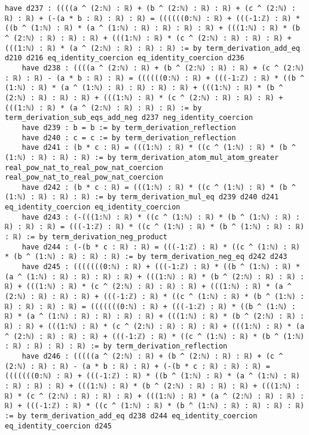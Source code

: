 \documentclass{article}
\begin{document}
\begin{tcolorbox}[colback=white!10, width=\linewidth]
\begin{lstlisting}[language=Lean4]
    have d237 : ((((a ^ (2:ℕ) : ℝ) + (b ^ (2:ℕ) : ℝ) : ℝ) + (c ^ (2:ℕ) : ℝ) : ℝ) + (-(a * b : ℝ) : ℝ) : ℝ) = ((((((0:ℕ) : ℝ) + (((-1:ℤ) : ℝ) * ((b ^ (1:ℕ) : ℝ) * (a ^ (1:ℕ) : ℝ) : ℝ) : ℝ) : ℝ) + (((1:ℕ) : ℝ) * (b ^ (2:ℕ) : ℝ) : ℝ) : ℝ) + (((1:ℕ) : ℝ) * (c ^ (2:ℕ) : ℝ) : ℝ) : ℝ) + (((1:ℕ) : ℝ) * (a ^ (2:ℕ) : ℝ) : ℝ) : ℝ) := by term_derivation_add_eq d210 d216 eq_identity_coercion eq_identity_coercion d236
    have d238 : ((((a ^ (2:ℕ) : ℝ) + (b ^ (2:ℕ) : ℝ) : ℝ) + (c ^ (2:ℕ) : ℝ) : ℝ) - (a * b : ℝ) : ℝ) = ((((((0:ℕ) : ℝ) + (((-1:ℤ) : ℝ) * ((b ^ (1:ℕ) : ℝ) * (a ^ (1:ℕ) : ℝ) : ℝ) : ℝ) : ℝ) + (((1:ℕ) : ℝ) * (b ^ (2:ℕ) : ℝ) : ℝ) : ℝ) + (((1:ℕ) : ℝ) * (c ^ (2:ℕ) : ℝ) : ℝ) : ℝ) + (((1:ℕ) : ℝ) * (a ^ (2:ℕ) : ℝ) : ℝ) : ℝ) := by term_derivation_sub_eqs_add_neg d237 neg_identity_coercion
    have d239 : b = b := by term_derivation_reflection
    have d240 : c = c := by term_derivation_reflection
    have d241 : (b * c : ℝ) = (((1:ℕ) : ℝ) * ((c ^ (1:ℕ) : ℝ) * (b ^ (1:ℕ) : ℝ) : ℝ) : ℝ) := by term_derivation_atom_mul_atom_greater real_pow_nat_to_real_pow_nat_coercion real_pow_nat_to_real_pow_nat_coercion
    have d242 : (b * c : ℝ) = (((1:ℕ) : ℝ) * ((c ^ (1:ℕ) : ℝ) * (b ^ (1:ℕ) : ℝ) : ℝ) : ℝ) := by term_derivation_mul_eq d239 d240 d241 eq_identity_coercion eq_identity_coercion
    have d243 : (-(((1:ℕ) : ℝ) * ((c ^ (1:ℕ) : ℝ) * (b ^ (1:ℕ) : ℝ) : ℝ) : ℝ) : ℝ) = (((-1:ℤ) : ℝ) * ((c ^ (1:ℕ) : ℝ) * (b ^ (1:ℕ) : ℝ) : ℝ) : ℝ) := by term_derivation_neg_product
    have d244 : (-(b * c : ℝ) : ℝ) = (((-1:ℤ) : ℝ) * ((c ^ (1:ℕ) : ℝ) * (b ^ (1:ℕ) : ℝ) : ℝ) : ℝ) := by term_derivation_neg_eq d242 d243
    have d245 : (((((((0:ℕ) : ℝ) + (((-1:ℤ) : ℝ) * ((b ^ (1:ℕ) : ℝ) * (a ^ (1:ℕ) : ℝ) : ℝ) : ℝ) : ℝ) + (((1:ℕ) : ℝ) * (b ^ (2:ℕ) : ℝ) : ℝ) : ℝ) + (((1:ℕ) : ℝ) * (c ^ (2:ℕ) : ℝ) : ℝ) : ℝ) + (((1:ℕ) : ℝ) * (a ^ (2:ℕ) : ℝ) : ℝ) : ℝ) + (((-1:ℤ) : ℝ) * ((c ^ (1:ℕ) : ℝ) * (b ^ (1:ℕ) : ℝ) : ℝ) : ℝ) : ℝ) = (((((((0:ℕ) : ℝ) + (((-1:ℤ) : ℝ) * ((b ^ (1:ℕ) : ℝ) * (a ^ (1:ℕ) : ℝ) : ℝ) : ℝ) : ℝ) + (((1:ℕ) : ℝ) * (b ^ (2:ℕ) : ℝ) : ℝ) : ℝ) + (((1:ℕ) : ℝ) * (c ^ (2:ℕ) : ℝ) : ℝ) : ℝ) + (((1:ℕ) : ℝ) * (a ^ (2:ℕ) : ℝ) : ℝ) : ℝ) + (((-1:ℤ) : ℝ) * ((c ^ (1:ℕ) : ℝ) * (b ^ (1:ℕ) : ℝ) : ℝ) : ℝ) : ℝ) := by term_derivation_reflection
    have d246 : (((((a ^ (2:ℕ) : ℝ) + (b ^ (2:ℕ) : ℝ) : ℝ) + (c ^ (2:ℕ) : ℝ) : ℝ) - (a * b : ℝ) : ℝ) + (-(b * c : ℝ) : ℝ) : ℝ) = (((((((0:ℕ) : ℝ) + (((-1:ℤ) : ℝ) * ((b ^ (1:ℕ) : ℝ) * (a ^ (1:ℕ) : ℝ) : ℝ) : ℝ) : ℝ) + (((1:ℕ) : ℝ) * (b ^ (2:ℕ) : ℝ) : ℝ) : ℝ) + (((1:ℕ) : ℝ) * (c ^ (2:ℕ) : ℝ) : ℝ) : ℝ) + (((1:ℕ) : ℝ) * (a ^ (2:ℕ) : ℝ) : ℝ) : ℝ) + (((-1:ℤ) : ℝ) * ((c ^ (1:ℕ) : ℝ) * (b ^ (1:ℕ) : ℝ) : ℝ) : ℝ) : ℝ) := by term_derivation_add_eq d238 d244 eq_identity_coercion eq_identity_coercion d245

\end{lstlisting}
\end{tcolorbox}
\end{document}
